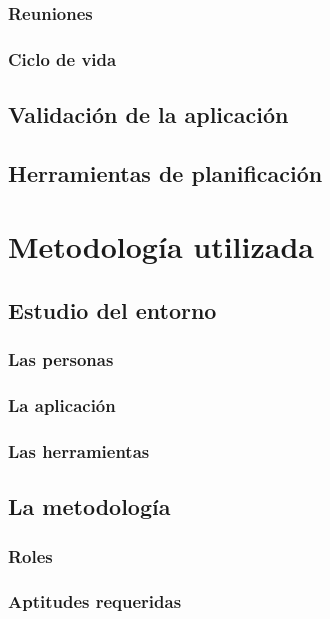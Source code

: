 \documentclass{iccmemoria}
\begin{document}
		\subsection{Reuniones}
		
		\subsection{Ciclo de vida}
		

	\section{Validación de la aplicación}
		

	\section{Herramientas de planificación}
		
	
\chapter{Metodología utilizada}

	\section{Estudio del entorno}
		\subsection{Las personas}
		\subsection{La aplicación}
		\subsection{Las herramientas}
		
	
	\section{La metodología}
	
		\subsection{Roles}
		\subsection{Aptitudes requeridas}
\end{document}

